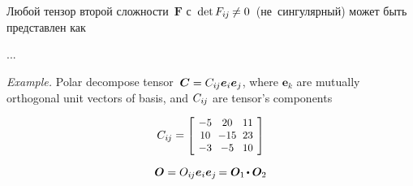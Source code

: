 

\label{para:polardecomposition}

\begin{otherlanguage}{russian}

Любой тензор второй сложности~${\bm{F}}$ с~${\operatorname{det} F_{i\hspace{-0.1ex}j} \hspace{-0.16ex} \neq 0}$~(не~сингулярный) может быть представлен как

...

\begin{tcolorbox}
\small\setlength{\abovedisplayskip}{2pt}\setlength{\belowdisplayskip}{2pt}

\emph{Example.} Polar decompose tensor~${\bm{C} = C_{i\hspace{-0.1ex}j} \bm{e}_i \bm{e}_j}$, where $\bm{e}_k$ are mutually orthogonal unit vectors of basis, and $C_{i\hspace{-0.1ex}j}$ are tensor’s components

\begin{equation*}
C_{i\hspace{-0.1ex}j} =
\scalebox{0.92}[0.92]{$\left[\hspace{-0.2ex}\begin{array}{c@{\hspace{.6em}}c@{\hspace{.6em}}c}
-5 & 20 & 11 \\
10 & -15 & 23 \\
-3 & -5 & 10
\end{array}\hspace{-0.2ex}\right]$}
\end{equation*}

\begin{equation*}
\rotationtensor = O_{i\hspace{-0.1ex}j} \bm{e}_i \bm{e}_j \hspace{-0.2ex}
= \bm{O}_1 \hspace{-0.2ex} \dotp \bm{O}_2
\end{equation*}


\end{tcolorbox}
\end{otherlanguage}
